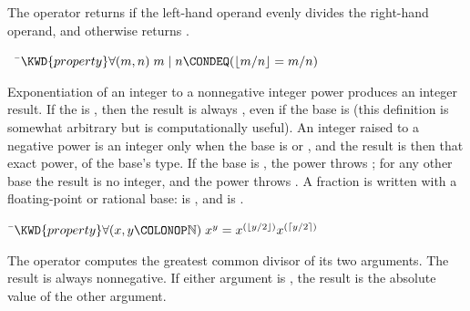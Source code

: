 
The operator \EXP{ \mid } returns  if the left-hand operand evenly divides the
right-hand operand, and otherwise returns .

\begin{Fortress}
{\tt~~}\pushtabs\=\+\(  \KWD{property} \forall (m, n)\;  m \mid n \CONDEQ (\lfloor m/n \rfloor = m/n)\)\-\\\poptabs
\end{Fortress}



Exponentiation of an integer to a nonnegative integer power produces an integer result.
If the  is , then the result is always , even if the base is 
(this definition is somewhat arbitrary but is computationally useful).
An integer raised to a negative power is an integer only when the base is
 or , and the result is then that exact power, of the base's type.
If the base is , the power throws ; for any other
base the result is no integer, and the power throws .
A fraction is written with a floating-point or rational base: 
is , and  is .

\begin{Fortress}
{\tt~}\pushtabs\=\+\( \KWD{property} \forall(x, y\COLONOP\mathbb{N})\; x^{y} = x^{(\lfloor y/2 \rfloor)} x^{(\lceil y/2 \rceil)}\)\-\\\poptabs
\end{Fortress}


The operator  computes the greatest common divisor of its two arguments.
The result is always nonnegative.  If either argument is , the result
is the absolute value of the other argument.

